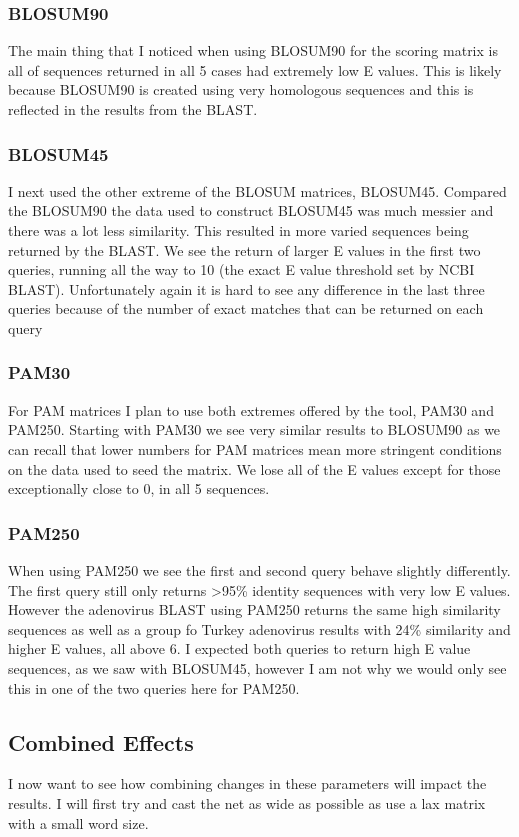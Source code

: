 \documentclass[12pt, oneside]{article}
\begin{document}
\subsubsection*{BLOSUM90}
The main thing that I noticed when using BLOSUM90 for the scoring matrix is all of sequences returned in all 5 cases had extremely low E values. This is likely because BLOSUM90 is created using very homologous sequences and this is reflected in the results from the BLAST.
\subsubsection*{BLOSUM45}
I next used the other extreme of the BLOSUM matrices, BLOSUM45. Compared the BLOSUM90 the data used to construct BLOSUM45 was much messier and there was a lot less similarity. This resulted in more varied sequences being returned by the BLAST. We see the return of larger E values in the first two queries, running all the way to 10 (the exact E value threshold set by NCBI BLAST). Unfortunately again it is hard to see any difference in the last three queries because of the number of exact matches that can be returned on each query
\subsubsection*{PAM30}
For PAM matrices I plan to use both extremes offered by the tool, PAM30 and PAM250. Starting with PAM30 we see very similar results to BLOSUM90 as we can recall that lower numbers for PAM matrices mean more stringent conditions on the data used to seed the matrix. We lose all of the E values except for those exceptionally close to 0, in all 5 sequences.
\subsubsection*{PAM250}
When using PAM250 we see the first and second query behave slightly differently. The first query still only returns >95\% identity sequences with very low E values. However the adenovirus BLAST using PAM250 returns the same high similarity sequences as well as a group fo Turkey adenovirus results with 24\% similarity and higher E values, all above 6. I expected both queries to return high E value sequences, as we saw with BLOSUM45, however I am not why we would only see this in one of the two queries here for PAM250.

\subsection*{Combined Effects}
I now want to see how combining changes in these parameters will impact the results. I will first try and cast the net as wide as possible as use a lax matrix with a small word size.
\end{document}
